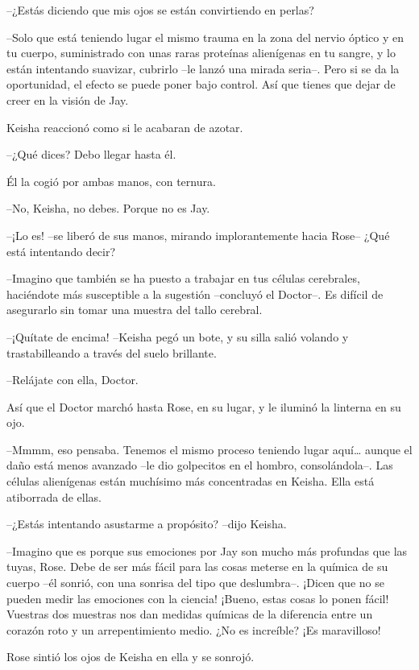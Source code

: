 {--¿Estás diciendo que mis ojos se están convirtiendo en perlas?}

{--Solo que está teniendo lugar el mismo trauma en la zona del nervio
 óptico y en tu cuerpo, suministrado con unas raras proteínas alienígenas
 en tu sangre, y lo están intentando suavizar, cubrirlo --le lanzó una
 mirada seria--. Pero si se da la oportunidad, el efecto se puede poner
bajo control. Así que tienes que dejar de creer en la visión de Jay.}

{Keisha reaccionó como si le acabaran de azotar.}

{--¿Qué dices? Debo llegar hasta él.}

{Él la cogió por ambas manos, con ternura.}

{--No, Keisha, no debes. Porque no es Jay.}

{--¡Lo es! --se liberó de sus manos, mirando implorantemente hacia
Rose-- ¿Qué está intentando decir?}

{--Imagino que también se ha puesto a trabajar en tus células
 cerebrales, haciéndote más susceptible a la sugestión --concluyó el
 Doctor--. Es difícil de asegurarlo sin tomar una muestra del tallo
cerebral.}

{--¡Quítate de encima! --Keisha pegó un bote, y su silla salió volando y
trastabilleando a través del suelo brillante.}

{--Relájate con ella, Doctor.}

{Así que el Doctor marchó hasta Rose, en su lugar, y le iluminó la
linterna en su ojo.}

{--Mmmm, eso pensaba. Tenemos el mismo proceso teniendo lugar
 aquí\ldots{} aunque el daño está menos avanzado --le dio golpecitos en
 el hombro, consolándola--. Las células alienígenas están muchísimo más
concentradas en Keisha. Ella está atiborrada de ellas.}

{--¿Estás intentando asustarme a propósito? --dijo Keisha.}

{--Imagino que es porque sus emociones por Jay son mucho más profundas
 que las tuyas, Rose. Debe de ser más fácil para las cosas meterse en la
 química de su cuerpo --él sonrió, con una sonrisa del tipo que
 deslumbra--. ¡Dicen que no se pueden medir las emociones con la ciencia!
 ¡Bueno, estas cosas lo ponen fácil! Vuestras dos muestras nos dan
 medidas químicas de la diferencia entre un corazón roto y un
arrepentimiento medio. ¿No es increíble? ¡Es maravilloso!}

{Rose sintió los ojos de Keisha en ella y se sonrojó.}

